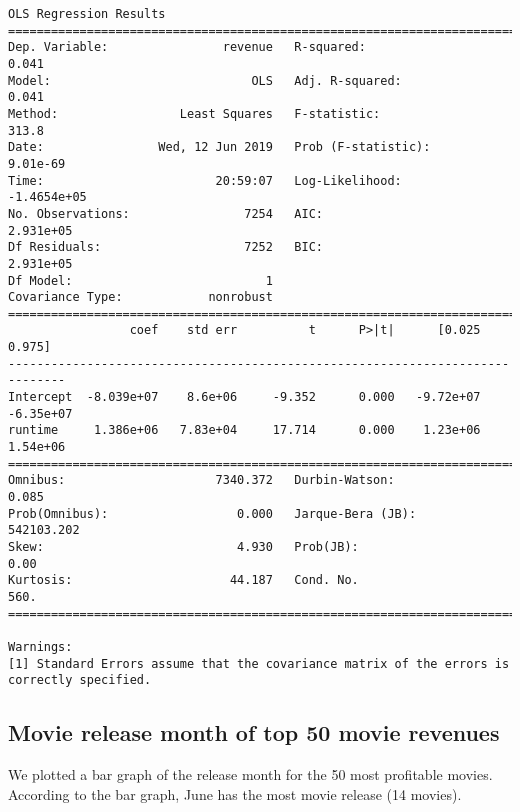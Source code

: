\documentclass[11pt]{article}
\begin{document}
    \begin{Verbatim}[commandchars=\\\{\}]
                            OLS Regression Results                            
==============================================================================
Dep. Variable:                revenue   R-squared:                       0.041
Model:                            OLS   Adj. R-squared:                  0.041
Method:                 Least Squares   F-statistic:                     313.8
Date:                Wed, 12 Jun 2019   Prob (F-statistic):           9.01e-69
Time:                        20:59:07   Log-Likelihood:            -1.4654e+05
No. Observations:                7254   AIC:                         2.931e+05
Df Residuals:                    7252   BIC:                         2.931e+05
Df Model:                           1                                         
Covariance Type:            nonrobust                                         
==============================================================================
                 coef    std err          t      P>|t|      [0.025      0.975]
------------------------------------------------------------------------------
Intercept  -8.039e+07    8.6e+06     -9.352      0.000   -9.72e+07   -6.35e+07
runtime     1.386e+06   7.83e+04     17.714      0.000    1.23e+06    1.54e+06
==============================================================================
Omnibus:                     7340.372   Durbin-Watson:                   0.085
Prob(Omnibus):                  0.000   Jarque-Bera (JB):           542103.202
Skew:                           4.930   Prob(JB):                         0.00
Kurtosis:                      44.187   Cond. No.                         560.
==============================================================================

Warnings:
[1] Standard Errors assume that the covariance matrix of the errors is correctly specified.

    \end{Verbatim}

    \subsection{Movie release month of top 50 movie
revenues}\label{movie-release-month-of-top-50-movie-revenues}

    We plotted a bar graph of the release month for the 50 most profitable
movies. According to the bar graph, June has the most movie release (14
movies).
\end{document}
